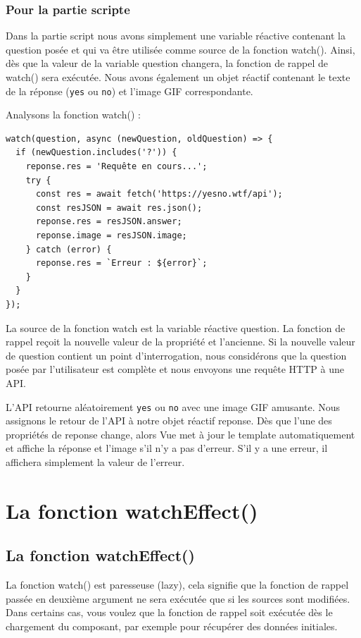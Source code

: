 \documentclass{article}
\begin{document}
\subsubsection{Pour la partie {\color{monOrange}scripte}}
Dans la partie script nous avons simplement une variable réactive contenant la question posée et qui va être utilisée comme source de la fonction {\color{monOrange}watch()}. Ainsi, dès que la valeur de la variable question changera, la fonction de rappel de watch() sera exécutée. Nous avons également un objet réactif contenant le texte de la réponse ({\tt yes} ou {\tt no}) et l'image GIF correspondante.

Analysons la fonction watch() :
\begin{verbatim}
watch(question, async (newQuestion, oldQuestion) => {
  if (newQuestion.includes('?')) {
    reponse.res = 'Requête en cours...';
    try {
      const res = await fetch('https://yesno.wtf/api');
      const resJSON = await res.json();
      reponse.res = resJSON.answer;
      reponse.image = resJSON.image;
    } catch (error) {
      reponse.res = `Erreur : ${error}`;
    }
  }
});
\end{verbatim}
La source de la fonction {\color{monOrange}watch} est la variable réactive {\color{monOrange}question}. La fonction de rappel reçoit la nouvelle valeur de la propriété et l'ancienne. Si la nouvelle valeur de {\color{monOrange}question} contient un point d'interrogation, nous considérons que la question posée par l'utilisateur est complète et nous envoyons une requête HTTP à une API.

L'API retourne aléatoirement {\tt yes} ou {\tt no} avec une image GIF amusante. Nous assignons le retour de l'API à notre objet réactif {\color{monOrange}reponse}. Dès que l'une des propriétés de reponse change, alors {\color{monOrange}Vue} met à jour le {\color{monOrange}template} automatiquement et affiche la réponse et l'image s'il n'y a pas d'erreur. S'il y a une erreur, il affichera simplement la valeur de l'erreur.

\section{La fonction watchEffect()}
\subsection{La fonction {\color{monOrange}watchEffect()}}
La fonction {\color{monOrange}watch()} est paresseuse ({\color{monOrange}lazy}), cela signifie que la fonction de rappel passée en deuxième argument ne sera exécutée que si les sources sont modifiées. Dans certains cas, vous voulez que la fonction de rappel soit exécutée dès le chargement du composant, par exemple pour récupérer des données initiales.
\end{document}
